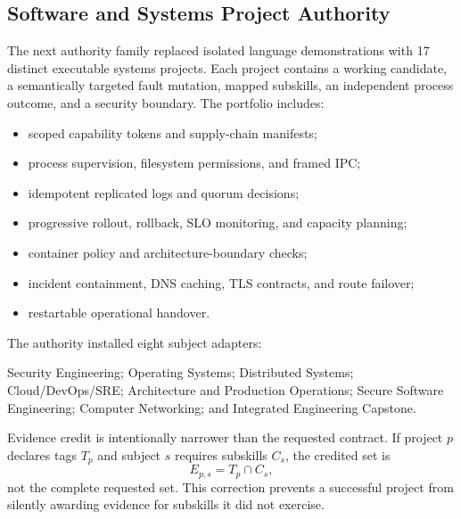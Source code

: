 \subsection{Software and Systems Project Authority}
\label{subsec:aion-software-system-authority}

The next authority family replaced isolated language demonstrations with 17
distinct executable systems projects.  Each project contains a working
candidate, a semantically targeted fault mutation, mapped subskills, an
independent process outcome, and a security boundary.  The portfolio includes:
\begin{itemize}
    \item scoped capability tokens and supply-chain manifests;
    \item process supervision, filesystem permissions, and framed IPC;
    \item idempotent replicated logs and quorum decisions;
    \item progressive rollout, rollback, SLO monitoring, and capacity planning;
    \item container policy and architecture-boundary checks;
    \item incident containment, DNS caching, TLS contracts, and route failover;
    \item restartable operational handover.
\end{itemize}

The authority installed eight subject adapters:
\begin{center}
\small
Security Engineering; Operating Systems; Distributed Systems;
Cloud/DevOps/SRE; Architecture and Production Operations; Secure Software
Engineering; Computer Networking; and Integrated Engineering Capstone.
\end{center}

Evidence credit is intentionally narrower than the requested contract.  If
project $p$ declares tags $T_p$ and subject $s$ requires subskills $C_s$, the
credited set is
\begin{equation}
E_{p,s}=T_p\cap C_s,
\label{eq:aion-exact-subskill-credit}
\end{equation}
not the complete requested set.  This correction prevents a successful project
from silently awarding evidence for subskills it did not exercise.

